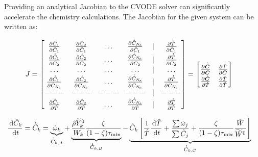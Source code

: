 Providing an analytical Jacobian to the CVODE solver can significantly accelerate the chemistry calculations. The Jacobian for the given system can be written as:

\begin{align}
J &=
\begin{bmatrix}
\frac{\partial\dot{\hat{C}}_{1}}{\partial \hat{C}_{1}}& \frac{\partial \dot{\hat{C}}_{2}}{\partial \hat{C}_{1}} & \ldots & \frac{\partial \dot{\hat{C}}_{N_{\rm s}}}{\partial \hat{C}_{1}} & | & \frac{\partial \dot{\hat{T}}}{\partial \hat{C}_{1}}\\
\frac{\partial\dot{\hat{C}}_{1}}{\partial \hat{C}_{2}}& \frac{\partial \dot{\hat{C}}_{2}}{\partial \hat{C}_{2}} & \ldots & \frac{\partial \dot{\hat{C}}_{N_{\rm s}}}{\partial \hat{C}_{2}} & | &\frac{\partial \dot{\hat{T}}}{\partial \hat{C}_{2}}\\
\ldots & \ldots & \ldots & \ldots & | & \ldots\\
\frac{\partial \dot{\hat{C}}_{1}}{\partial \hat{C}_{N_{\rm s}}}& \frac{\partial \dot{\hat{C}}_{2}}{\partial \hat{C}_{N_{\rm s}}} & \ldots & \frac{\partial \dot{\hat{C}}_{N_{\rm s}}}{\partial \hat{C}_{N_{\rm s}}} & | & \frac{\partial \dot{\hat{T}}}{\partial \hat{C}_{N_{\rm s}}}\\
---& --- & --- & --- & | & ---\\
\frac{\partial \dot{\hat{C}}_{1}}{\partial \hat{T}}& \frac{\partial \dot{\hat{C}}_{2}}{\partial \hat{T}} & \ldots & \frac{\partial \dot{\hat{C}}_{N_{\rm s}}}{\partial \hat{T}} & | & \frac{\partial \dot{\hat{T}}}{\partial \hat{T}}\\
\end{bmatrix}
=\begin{bmatrix}
\frac{\partial \boldsymbol{\dot{\hat{C}}}}{\boldsymbol{\partial \hat{C}}}& \frac{\partial \dot{\hat{T}}}{\partial \boldsymbol{\hat{C}}}\\
\frac{\partial \boldsymbol{\dot{\hat{C}}}}{\partial \hat{T}}& \frac{\partial \dot{\hat{T}}}{\partial \hat{T}}
\end{bmatrix}
\label{eq:jacobian_mix_chem}
\end{align}


\begin{align} \label{eq:jspeciemolarconcentration3}
    \frac{\,\mathrm{d} {\hat{C}_{k}}}{\,\mathrm{d} t} &= \dot{\hat{C}}_k = \underbrace{\dot{\omega}_k}_{\dot{\hat{C}}_{k,A}}
    + \underbrace{\frac{\hat{\rho} \widetilde{Y}_k^0}{W_k} \frac{\zeta}{(1-\zeta) \tau_{\rm mix}}}_{\dot{\hat{C}}_{k,B}}
    - \underbrace{\hat{C}_{k} \left[ \frac{1}{\hat{T}} \frac{\,\mathrm{d} \hat{T}}{\,\mathrm{d} t} + \frac{\sum{\dot{\omega}_j}}{\sum{\hat{C}_j}}+\frac{\zeta}{(1-\zeta)\tau_{\rm mix}}\frac{\hat{W}}{\widetilde{W}^0} \right] }_{\dot{\hat{C}}_{k,C}}
\end{align}

